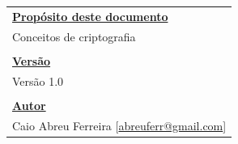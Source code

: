 \chapter*{}
\vspace*{\fill}
\begin{flushright}
    \begin{tabular}{l}
    \textbf{\underline{Propósito deste documento}} \\
    Conceitos de criptografia \\
    \\
    \textbf{\underline{Versão}} \\
    Versão 1.0 \\
    \\
    \textbf{\underline{Autor}} \\
    Caio Abreu Ferreira [\href{mailto:abreuferr@gmail.com}{abreuferr@gmail.com}] \\
    \end{tabular}
\end{flushright}
